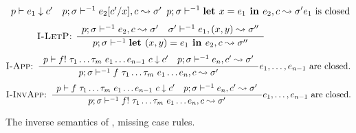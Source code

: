 \begin{figure}[ht!]
\begin{align*}
{\begin{array}{cc}
       p \vdash e_1 \downarrow c' &
       p;\sigma\vdash^{-1}e_2[c' / x], c \leadsto \sigma'
     \end{array}}
    {p;\sigma\vdash^{-1}\textbf{let } x = e_1 \textbf{ in } e_2, c \leadsto \sigma'}
    \text{$e_1$ is closed}
\end{align*}
\begin{align*}
\textsc{I-LetP: }
  \dfrac
    {\begin{array}{ccc}
       p;\sigma\vdash^{-1} e_2, c \leadsto \sigma' &
       \sigma' \vdash^{-1} e_1, (x, y) \leadsto \sigma''
     \end{array}}
    {p;\sigma\vdash^{-1} \textbf{let } (x,y) = e_1 \textbf{ in } e_2, c \leadsto \sigma''}
\end{align*}
\begin{align*}
\textsc{I-App: }
  \dfrac
    {\begin{array}{ll}
        p \vdash f!~\tau_1 \dots \tau_m~e_1 \dots e_{n-1}~c \downarrow c' &
        p;\sigma\vdash^{-1} e_n, c' \leadsto \sigma'
    \end{array}}
    {p;\sigma\vdash^{-1} f~\tau_1 \dots \tau_m~e_1 \dots e_n, c \leadsto \sigma'}
    \text{$e_1, \dots, e_{n-1}$ are closed.}
\end{align*}
\begin{align*}
\textsc{I-InvApp: }
  \dfrac
    {\begin{array}{ll}
        p \vdash f~\tau_1 \dots \tau_m~e_1 \dots e_{n-1}~c \downarrow c' &
        p;\sigma\vdash^{-1} e_n, c' \leadsto \sigma'
    \end{array}}
    {p;\sigma\vdash^{-1} f!~\tau_1 \dots \tau_m~e_1 \dots e_n, c \leadsto \sigma'}
    \text{$e_1, \dots, e_{n-1}$ are closed.}
\end{align*}
\caption{The inverse semantics of \rfunc, missing case rules.}\label{fig:inverse_semantics}
\end{figure}

